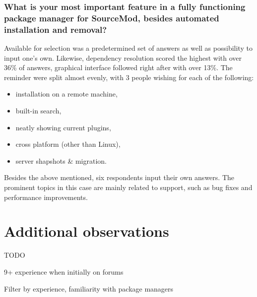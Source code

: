 \subsubsection{What is your most important feature in a fully functioning package manager for SourceMod, besides automated installation and removal?}

Available for selection was a predetermined set of answers as well as possibility to input one's own.
Likewise, dependency resolution scored the highest with over 36\% of answers, graphical interface followed right after with over 13\%.
The reminder were split almost evenly, with 3 people wishing for each of the following:

\begin{itemize}
    \item installation on a remote machine,
    \item built-in search,
    \item neatly showing current plugins,
    \item cross platform (other than Linux),
    \item server shapshots \& migration.
\end{itemize}

Besides the above mentioned, six respondents input their own answers.
The prominent topics in this case are mainly related to support, such as bug fixes and performance improvements.

\section{Additional observations}

TODO

9+ experience when initially on forums

Filter by experience, familiarity with package managers
